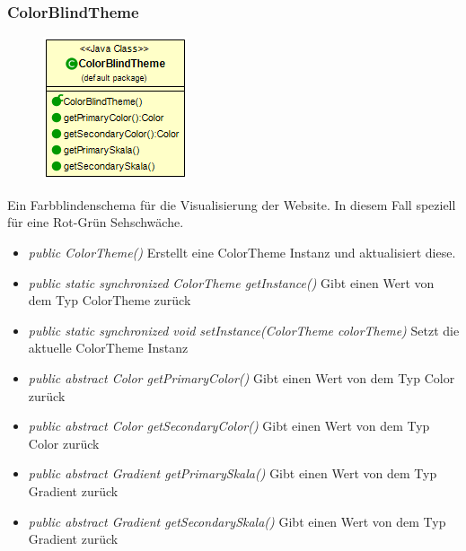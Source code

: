 \begin{itemize} [noitemsep]
\subsubsection{ColorBlindTheme}
\begin{minipage}{0.3\textwidth}
\begin{figure}[H]
    \includegraphics[scale = 0.5
    ]{media/view/theme/ColorBlindTheme_Class.png}
\end{figure}
\end{minipage} \hfill
\begin{minipage}{0.6\textwidth}
    Ein Farbblindenschema für die Visualisierung der Website. In diesem Fall speziell für eine Rot-Grün Sehschwäche.
\end{minipage}
    
\begin{itemize} [noitemsep]
    \item \emph{public ColorTheme()} Erstellt eine ColorTheme Instanz und aktualisiert diese.
    \item \emph{public static synchronized ColorTheme getInstance()} Gibt einen Wert von dem Typ ColorTheme zurück
    \item \emph{public static synchronized void setInstance(ColorTheme colorTheme)} Setzt die aktuelle ColorTheme Instanz
    \item \emph{public abstract Color getPrimaryColor()} Gibt einen Wert von dem Typ Color zurück
    \item \emph{public abstract Color getSecondaryColor()} Gibt einen Wert von dem Typ Color zurück
    \item \emph{public abstract Gradient getPrimarySkala()} Gibt einen Wert von dem Typ Gradient zurück
    \item \emph{public abstract Gradient getSecondarySkala()}  Gibt einen Wert von dem Typ Gradient zurück
\end{itemize}


\end{itemize}

